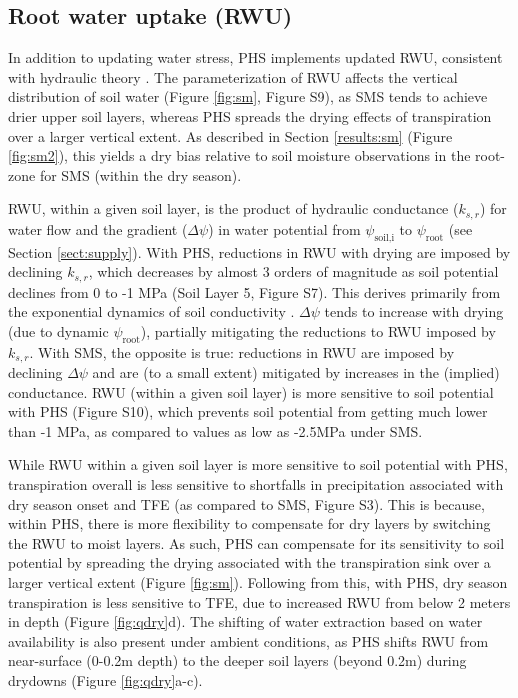 \documentclass[draft,linenumbers]{agujournal}
\begin{document}
\subsection{Root water uptake (RWU)}

In addition to updating water stress, PHS implements updated RWU, consistent with hydraulic theory \citep{cai2018,warren2015}.
The parameterization of RWU affects the vertical distribution of soil water (Figure \ref{fig:sm}, Figure S9), as
SMS tends to achieve drier upper soil layers, whereas PHS spreads the drying effects of transpiration over a larger vertical extent.
As described in Section \ref{results:sm} (Figure \ref{fig:sm2}), this yields a dry bias relative to soil moisture observations in the root-zone for SMS (within the dry season).

RWU, within a given soil layer, is the product of hydraulic conductance ($k_{s,r}$) for water flow and the gradient ($\Delta\psi$) in water potential from $\psi_{\text{soil,i}}$ to $\psi_\text{root}$ (see Section \ref{sect:supply}).
With PHS, reductions in RWU with drying are imposed by declining $k_{s,r}$, which decreases by almost 3 orders of magnitude as soil potential declines from 0 to -1 MPa (Soil Layer 5, Figure S7).
This derives primarily from the exponential dynamics of soil conductivity \citep{brooks1964}.
$\Delta\psi$ tends to increase with drying (due to dynamic $\psi_{\text{root}}$), partially mitigating the reductions to RWU imposed by $k_{s,r}$.
With SMS, the opposite is true: reductions in RWU are imposed by declining $\Delta\psi$ and are (to a small extent) mitigated by increases in the (implied) conductance. 
RWU (within a given soil layer) is more sensitive to soil potential with PHS (Figure S10), which prevents soil potential from getting much lower than -1 MPa, as compared to values as low as -2.5MPa under SMS.

While RWU within a given soil layer is more sensitive to soil potential with PHS, transpiration overall is less sensitive to shortfalls in precipitation
associated with dry season onset and TFE (as compared to SMS, Figure S3).
This is because, within PHS, there is more flexibility to compensate for dry layers by switching the RWU to moist layers.
As such, PHS can compensate for its sensitivity to soil potential by spreading the drying associated with the transpiration sink over a larger vertical extent (Figure \ref{fig:sm}).
Following from this, with PHS, dry season transpiration is less sensitive to TFE, due to increased RWU from below 2 meters in depth (Figure \ref{fig:qdry}d).
The shifting of water extraction based on water availability is also present under ambient conditions, as PHS shifts RWU from near-surface (0-0.2m depth) to the deeper soil layers (beyond 0.2m) during drydowns (Figure \ref{fig:qdry}a-c).
\end{document}
